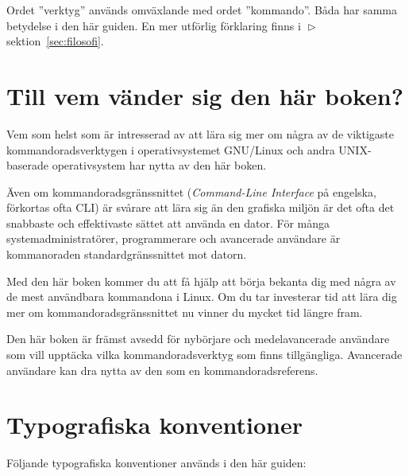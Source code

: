 \documentclass[10pt,a4paper,final]{book}
\newcommand{\secref}[1]{$\vartriangleright$\hspace*{.1em}sektion~\ref{#1}}
\newcommand{\xeng}[1]{\textit{#1} på engelska}
\begin{document}
Ordet ''verktyg'' används omväxlande med ordet ''kommando''. Båda har samma betydelse i den här guiden. En mer utförlig förklaring finns i \secref{sec:filosofi}.

\section{Till vem vänder sig den här boken?}

Vem som helst som är intresserad av att lära sig mer om några av de viktigaste kommandoradsverktygen i operativsystemet GNU/Linux och andra UNIX-baserade operativsystem har nytta av den här boken.

Även om kommandoradsgränssnittet (\xeng{Command-Line Interface}, förkortas ofta CLI) är svårare att lära sig än den grafiska miljön är det ofta det snabbaste och effektivaste sättet att använda en dator. För många systemadministratörer, programmerare och avancerade användare är kommanoraden standardgränssnittet mot datorn.

Med den här boken kommer du att få hjälp att börja bekanta dig med några av de mest användbara kommandona i Linux. Om du tar investerar tid att lära dig mer om kommandoradsgränssnittet nu vinner du mycket tid längre fram.

Den här boken är främst avsedd för nybörjare och medelavancerade användare som vill upptäcka vilka kommandoradsverktyg som finns tillgängliga. Avancerade användare kan dra nytta av den som en kommandoradsreferens. 

\section{Typografiska konventioner}

Följande typografiska konventioner används i den här guiden:
\end{document}
